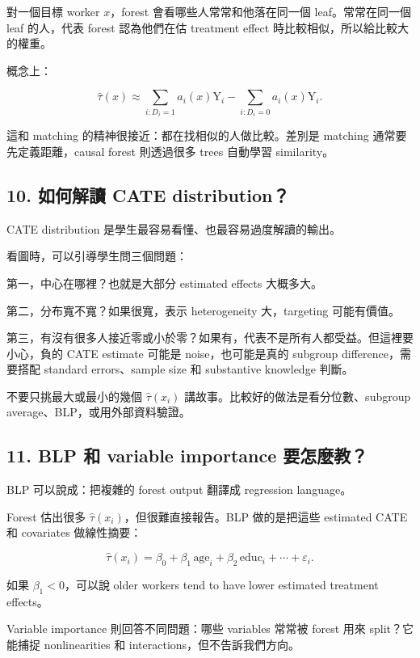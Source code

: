 \documentclass[
  chinese,
  11pt,
]{article}
\begin{document}
對一個目標 worker \(x\)，forest 會看哪些人常常和他落在同一個
leaf。常常在同一個 leaf 的人，代表 forest 認為他們在估 treatment effect
時比較相似，所以給比較大的權重。

概念上：

\[
\hat{\tau}(x)
\approx
\sum_{i:D_i=1} a_i(x)\mathrm{Y}_i
-
\sum_{i:D_i=0} a_i(x)\mathrm{Y}_i.
\]

這和 matching 的精神很接近：都在找相似的人做比較。差別是 matching
通常要先定義距離，causal forest 則透過很多 trees 自動學習 similarity。

\subsection{10. 如何解讀 CATE
distribution？}\label{ux5982ux4f55ux89e3ux8b80-cate-distribution}

CATE distribution 是學生最容易看懂、也最容易過度解讀的輸出。

看圖時，可以引導學生問三個問題：

第一，中心在哪裡？也就是大部分 estimated effects 大概多大。

第二，分布寬不寬？如果很寬，表示 heterogeneity 大，targeting
可能有價值。

第三，有沒有很多人接近零或小於零？如果有，代表不是所有人都受益。但這裡要小心，負的
CATE estimate 可能是 noise，也可能是真的 subgroup difference，需要搭配
standard errors、sample size 和 substantive knowledge 判斷。

不要只挑最大或最小的幾個 \(\hat{\tau}(x_i)\)
講故事。比較好的做法是看分位數、subgroup
average、BLP，或用外部資料驗證。

\subsection{11. BLP 和 variable importance
要怎麼教？}\label{blp-ux548c-variable-importance-ux8981ux600eux9ebcux6559}

BLP 可以說成：把複雜的 forest output 翻譯成 regression language。

Forest 估出很多 \(\hat{\tau}(x_i)\)，但很難直接報告。BLP 做的是把這些
estimated CATE 和 covariates 做線性摘要：

\[
\hat{\tau}(x_i)
=
\beta_0+\beta_1\,\text{age}_i+\beta_2\,\text{educ}_i+\cdots+\varepsilon_i.
\]

如果 \(\beta_1<0\)，可以說 older workers tend to have lower estimated
treatment effects。

Variable importance 則回答不同問題：哪些 variables 常常被 forest 用來
split？它能捕捉 nonlinearities 和 interactions，但不告訴我們方向。
\end{document}
